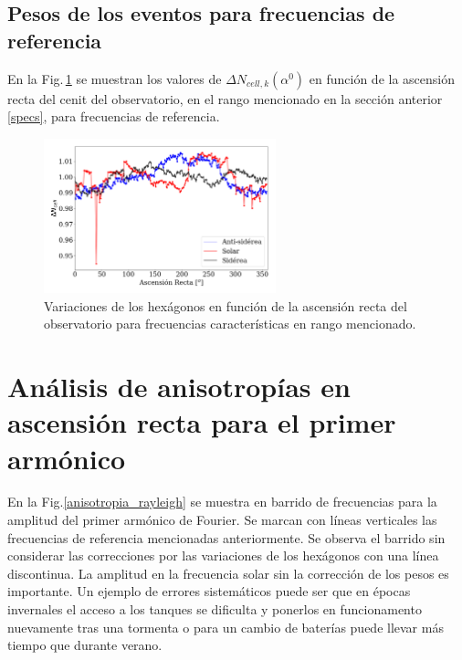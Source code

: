 \subsection{Pesos de los eventos para frecuencias de referencia}

En la Fig.\,\ref{pesos_bin_1_2} se muestran los valores de  $\Delta N_{cell,k}(\alpha^0)$ en función de la ascensión recta del cenit del observatorio, en el rango mencionado en la sección anterior \ref{specs}, para frecuencias de referencia. 
			 
			\begin{figure}[H]
				\centering
				\includegraphics[width=0.6\textwidth]{weights_2013_2020.png}
				\caption{Variaciones de los hexágonos en función de la ascensión recta del observatorio para frecuencias características en rango mencionado. }
				\label{pesos_bin_1_2}
			\end{figure}


\section{Análisis de anisotropías en ascensión recta para el primer armónico}

En la Fig.\ref{anisotropia_rayleigh} se muestra en barrido de frecuencias para la amplitud del primer armónico de Fourier. Se marcan con líneas verticales las frecuencias de referencia mencionadas anteriormente. Se observa el barrido sin considerar las correcciones por las variaciones de los hexágonos con una línea discontinua. La  amplitud  en la frecuencia solar sin la corrección de los pesos es importante. Un ejemplo de errores sistemáticos puede ser que en épocas invernales el acceso a los tanques se dificulta y ponerlos en funcionamento nuevamente tras una tormenta o para un cambio de baterías puede llevar más tiempo que durante verano. 

